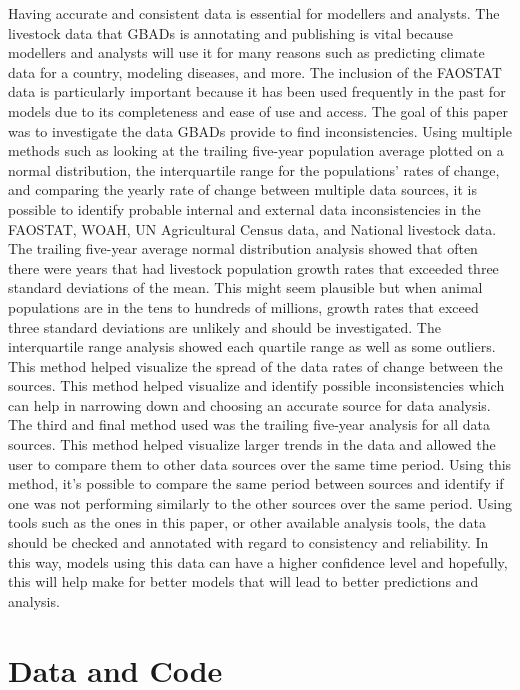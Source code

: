 \documentclass{article}
\begin{document}
Having accurate and consistent data is essential for modellers and analysts. The livestock data that GBADs is annotating and publishing is vital because modellers and analysts will use it for many reasons such as predicting climate data for a country, modeling diseases, and more. The inclusion of the FAOSTAT data is particularly important because it has been used frequently in the past for models due to its completeness and ease of use and access. The goal of this paper was to investigate the data GBADs provide to find inconsistencies. Using multiple methods such as looking at the trailing five-year population average plotted on a normal distribution, the interquartile range for the populations' rates of change, and comparing the yearly rate of change between multiple data sources, it is possible to identify probable internal and external data inconsistencies in the FAOSTAT, WOAH, UN Agricultural Census data, and National livestock data. The trailing five-year average normal distribution analysis showed that often there were years that had livestock population growth rates that exceeded three standard deviations of the mean. This might seem plausible but when animal populations are in the tens to hundreds of millions, growth rates that exceed three standard deviations are unlikely and should be investigated. The interquartile range analysis showed each quartile range as well as some outliers. This method helped visualize the spread of the data rates of change between the sources. This method helped visualize and identify possible inconsistencies which can help in narrowing down and choosing an accurate source for data analysis. The third and final method used was the trailing five-year analysis for all data sources. This method helped visualize larger trends in the data and allowed the user to compare them to other data sources over the same time period. Using this method, it's possible to compare the same period between sources and identify if one was not performing similarly to the other sources over the same period. Using tools such as the ones in this paper, or other available analysis tools, the data should be checked and annotated with regard to consistency and reliability. In this way, models using this data can have a higher confidence level and hopefully, this will help make for better models that will lead to better predictions and analysis.

\section{Data and Code}
\end{document}
